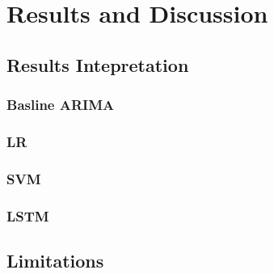 \chapter{Results and Discussion}
\label{chap:five}

\section{Results Intepretation}
\label{sec:results}

\subsection{Basline \acl{ARIMA}}
\subsection{\acl{LR}}
\subsection{\acl{SVM}}
\subsection{\acl{LSTM}}




\section{Limitations}
\label{sec:limitations}
